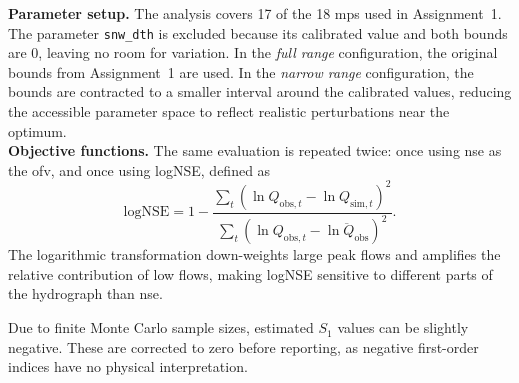 \textbf{Parameter setup.}
The analysis covers 17 of the 18 \acp{mp} used in Assignment~1. The parameter \texttt{snw\_dth} is excluded because its calibrated value and both bounds are 0, leaving no room for variation. In the \textit{full range} configuration, the original bounds from Assignment~1 are used. In the \textit{narrow range} configuration, the bounds are contracted to a smaller interval around the calibrated values, reducing the accessible parameter space to reflect realistic perturbations near the optimum.\\

\textbf{Objective functions.}
The same evaluation is repeated twice: once using \ac{nse} as the \ac{ofv}, and once using logNSE, defined as
\begin{equation}
    \text{logNSE} = 1 - \frac{\sum_t \left(\ln Q_{\text{obs},t} - \ln Q_{\text{sim},t}\right)^2}{\sum_t \left(\ln Q_{\text{obs},t} - \overline{\ln Q_{\text{obs}}}\right)^2}.
\end{equation}
The logarithmic transformation down-weights large peak flows and amplifies the relative contribution of low flows, making logNSE sensitive to different parts of the hydrograph than \ac{nse}.

Due to finite Monte Carlo sample sizes, estimated $S_1$ values can be slightly negative. These are corrected to zero before reporting, as negative first-order indices have no physical interpretation.
